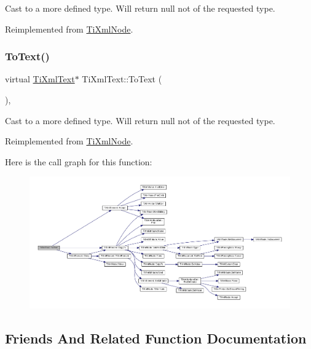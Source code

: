 Cast to a more defined type. Will return null not of the requested type. 



Reimplemented from \hyperlink{class_ti_xml_node_a2591700660b308571c09166559a39332}{Ti\+Xml\+Node}.

\mbox{\label{class_ti_xml_text_ae7c3a8fd3e4dbf6c0c4363a943d72f5b}} 
\subsubsection{\texorpdfstring{To\+Text()}{ToText()}\hspace{0.1cm}{\footnotesize\ttfamily [2/2]}}
{\footnotesize\ttfamily virtual \hyperlink{class_ti_xml_text}{Ti\+Xml\+Text}$\ast$ Ti\+Xml\+Text\+::\+To\+Text (\begin{DoxyParamCaption}{ }\end{DoxyParamCaption})\hspace{0.3cm}{\ttfamily [inline]}, {\ttfamily [virtual]}}



Cast to a more defined type. Will return null not of the requested type. 



Reimplemented from \hyperlink{class_ti_xml_node_a3ddfbcac78fbea041fad57e5c6d60a03}{Ti\+Xml\+Node}.

Here is the call graph for this function\+:\nopagebreak
\begin{figure}[H]
\begin{center}
\leavevmode
\includegraphics[width=350pt]{class_ti_xml_text_ae7c3a8fd3e4dbf6c0c4363a943d72f5b_cgraph}
\end{center}
\end{figure}


\subsection{Friends And Related Function Documentation}
\mbox{\label{class_ti_xml_text_ab6592e32cb9132be517cc12a70564c4b}} 
